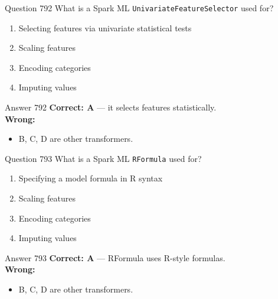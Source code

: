 \documentclass[aspectratio=169,11pt]{beamer}
\begin{document}
	\begin{frame}{Question 792}
		What is a Spark ML \texttt{UnivariateFeatureSelector} used for?
		\begin{enumerate}[label=\Alph*.]
			\item Selecting features via univariate statistical tests
			\item Scaling features
			\item Encoding categories
			\item Imputing values
		\end{enumerate}
	\end{frame}
	\begin{frame}{Answer 792}
		\textbf{Correct: A} --- it selects features statistically.\\
		\vspace{0.5em}
		\textbf{Wrong:}
		\begin{itemize}
			\item B, C, D are other transformers.
		\end{itemize}
	\end{frame}
	
	\begin{frame}{Question 793}
		What is a Spark ML \texttt{RFormula} used for?
		\begin{enumerate}[label=\Alph*.]
			\item Specifying a model formula in R syntax
			\item Scaling features
			\item Encoding categories
			\item Imputing values
		\end{enumerate}
	\end{frame}
	\begin{frame}{Answer 793}
		\textbf{Correct: A} --- RFormula uses R-style formulas.\\
		\vspace{0.5em}
		\textbf{Wrong:}
		\begin{itemize}
			\item B, C, D are other transformers.
		\end{itemize}
	\end{frame}
	
\end{document}
